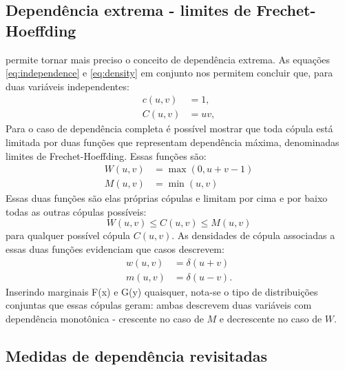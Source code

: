 \subsection{Dependência extrema - limites de Frechet-Hoeffding}

 permite tornar mais preciso o conceito de dependência extrema. As equações \eqref{eq:independence} e \eqref{eq:density} em conjunto nos permitem concluir que, para duas variáveis independentes:
\begin{align}
c(u,v) &= 1, \\
C(u,v) &= uv,
\end{align}
Para o caso de dependência completa é possível mostrar que\cite{Nelsen1999} toda cópula está limitada por duas funções que representam dependência máxima, denominadas limites de Frechet-Hoeffding. Essas funções são:
\begin{align}
\label{eq:frechethoeffding}
W(u,v) &= \max(0, u+v-1) \\
M(u,v) &= \min(u,v)
\end{align}
Essas duas funções são elas próprias cópulas e limitam por cima e por baixo todas as outras cópulas possíveis:
\begin{equation}
W\left(u,v\right) \le C(u,v) \le M(u,v)  
\end{equation}
para qualquer possível cópula $C(u,v)$. As densidades de cópula associadas a essas duas funções evidenciam que casos descrevem:
\begin{align}
w(u,v) &= \delta(u+v) \\
m(u,v) &= \delta(u-v).
\end{align}
Inserindo marginais F(x) e G(y) quaisquer, nota-se o tipo de distribuições conjuntas que essas cópulas geram: ambas descrevem duas variáveis com dependência monotônica - crescente no caso de $M$ e decrescente no caso de $W$.

\subsection{Medidas de dependência revisitadas}

